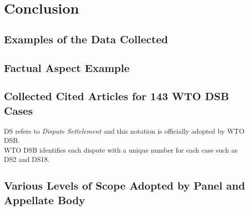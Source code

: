\documentclass[12pt,letterpaper]{article}
\begin{document}


\section{Conclusion}





\begin{appendices}
  \section{Examples of the Data Collected}
  \label{sec:appendix}


  \subsection{Factual Aspect Example}
  \label{sub:factual-aspect-example}
  



  \subsection{Collected Cited Articles for 143 WTO DSB Cases}
  DS refers to \textit{Dispute Settelement} and this notation is officially adopted by WTO DSB.\\
  WTO DSB identifies each dispute with a unique number for each case such as DS2 and DS18.
  \label{xltabular:level-of-scopes}
  

  \subsection{Various Levels of Scope Adopted by Panel and Appellate Body}
  \label{sub:cited-articles-table}


\end{appendices}
\end{document}
